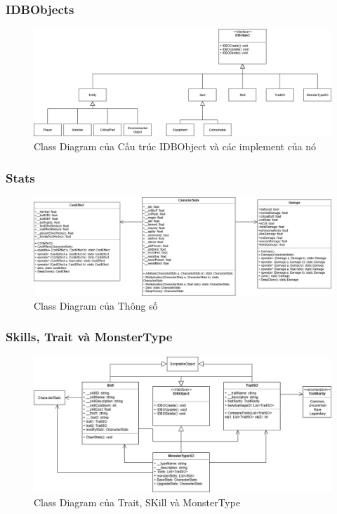 \subsubsection{IDBObjects}
\begin{figure}[H]
	\centering
	\includegraphics[width=\textwidth]{Images/CD/IDBOCD.drawio.png}
	\vspace{0.5cm}
	\caption{ Class Diagram của Cấu trúc IDBObject và các implement của nó}
\end{figure}
\subsubsection{Stats}
\begin{figure}[H]
	\centering
	\includegraphics[width=\textwidth]{Images/CD/StatsCD.drawio.png}
	\vspace{0.5cm}
	\caption{Class Diagram của Thông số}
\end{figure}
\subsubsection{Skills, Trait và MonsterType}
\begin{figure}[H]
	\centering
	\includegraphics[width=\textwidth]{Images/CD/traitCD.drawio.png}
	\vspace{0.5cm}
	\caption{Class Diagram của Trait, SKill và MonsterType}
\end{figure}
